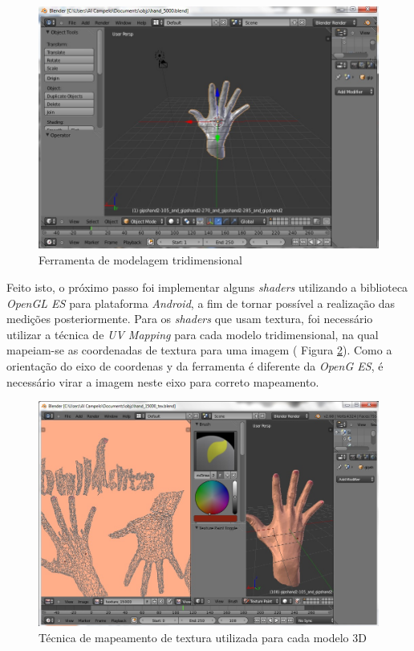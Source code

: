 	\begin{figure}[h]
	\centering
		\includegraphics[keepaspectratio=true,scale=0.7]{figuras/blender.jpg}
	\caption{Ferramenta de modelagem tridimensional}
	\label{blender}
	\end{figure}
	
	Feito isto, o próximo passo foi implementar alguns \textit{shaders} utilizando a biblioteca \textit{OpenGL ES} para plataforma \textit{Android}, a fim de tornar possível a realização das medições posteriormente. Para os \textit{shaders} que usam textura, foi necessário utilizar a técnica de \textit{UV Mapping} para cada modelo tridimensional, na qual mapeiam-se as coordenadas de textura para uma imagem ( Figura \ref{uvmap}). Como a orientação do eixo de coordenas y da ferramenta é diferente da \textit{OpenG ES}, é necessário virar a imagem neste eixo para correto mapeamento.

	\begin{figure}[h]
	\centering
		\includegraphics[keepaspectratio=true,scale=0.6]{figuras/uvmap.jpg}
	\caption{Técnica de mapeamento de textura utilizada para cada modelo 3D}
	\label{uvmap}
	\end{figure}

